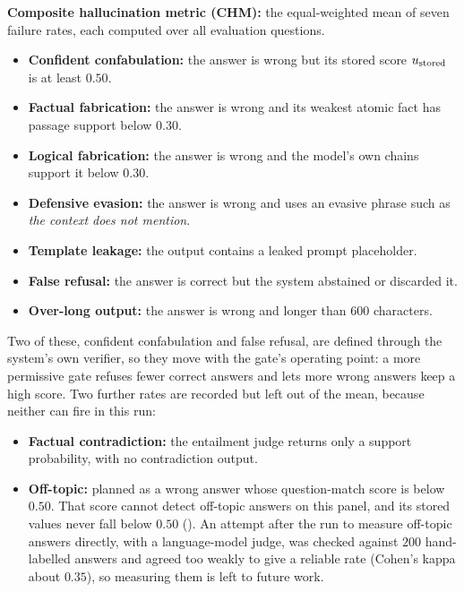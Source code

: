 \textbf{Composite hallucination metric (CHM):} the equal-weighted mean of seven failure rates, each computed over all evaluation questions.
\begin{itemize}
    \item \textbf{Confident confabulation:} the answer is wrong but its stored score $u_{\text{stored}}$ is at least $0.50$.
    \item \textbf{Factual fabrication:} the answer is wrong and its weakest atomic fact has passage support below $0.30$.
    \item \textbf{Logical fabrication:} the answer is wrong and the model's own chains support it below $0.30$.
    \item \textbf{Defensive evasion:} the answer is wrong and uses an evasive phrase such as \emph{the context does not mention}.
    \item \textbf{Template leakage:} the output contains a leaked prompt placeholder.
    \item \textbf{False refusal:} the answer is correct but the system abstained or discarded it.
    \item \textbf{Over-long output:} the answer is wrong and longer than $600$ characters.
\end{itemize}
Two of these, confident confabulation and false refusal, are defined through the system's own verifier, so they move with the gate's operating point: a more permissive gate refuses fewer correct answers and lets more wrong answers keep a high score. Two further rates are recorded but left out of the mean, because neither can fire in this run:
\begin{itemize}
    \item \textbf{Factual contradiction:} the entailment judge returns only a support probability, with no contradiction output.
    \item \textbf{Off-topic:} planned as a wrong answer whose question-match score is below $0.50$. That score cannot detect off-topic answers on this panel, and its stored values never fall below $0.50$ (). An attempt after the run to measure off-topic answers directly, with a language-model judge, was checked against $200$ hand-labelled answers and agreed too weakly to give a reliable rate (Cohen's kappa about $0.35$), so measuring them is left to future work.
\end{itemize}

